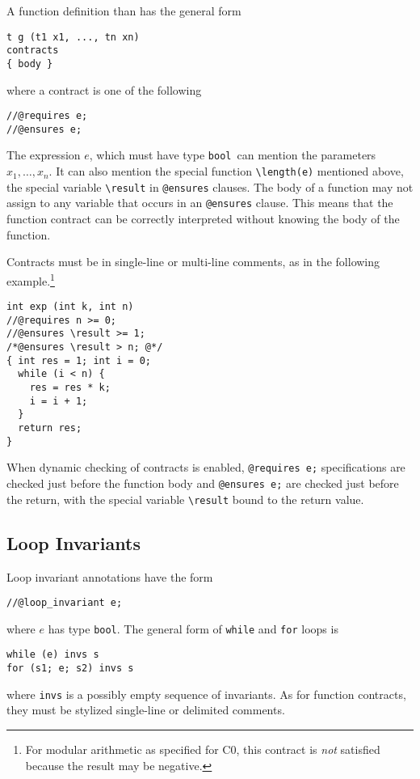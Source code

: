 \documentclass[11pt]{article}
\newcommand{\tbool}{\texttt{bool}}
\begin{document}
A function definition than has the general form
\begin{lstlisting}
t g (t1 x1, ..., tn xn)
contracts
{ body }
\end{lstlisting}
where a contract is one of the following
\begin{lstlisting}
//@requires e;
//@ensures e;
\end{lstlisting}
The expression $e$, which must have type \tbool\ can mention the
parameters $x_1, \ldots, x_n$.  It can also mention the special
function \lstinline'\length(e)' mentioned above, the special variable
\lstinline'\result' in \lstinline'@ensures' clauses.  The body of a function may
not assign to any variable that occurs in an \lstinline'@ensures' clause.
This means that the function contract can be correctly interpreted
without knowing the body of the function.

Contracts must be in single-line or multi-line comments, as in the
following example.\footnote{For modular arithmetic as specified
for C0, this contract is \emph{not} satisfied because the result may be
negative.}
\begin{lstlisting}
int exp (int k, int n)
//@requires n >= 0;
//@ensures \result >= 1;
/*@ensures \result > n; @*/
{ int res = 1; int i = 0;
  while (i < n) {
    res = res * k;
    i = i + 1;
  }
  return res;
}
\end{lstlisting}

When dynamic checking of contracts is enabled,
\lstinline'@requires e;' specifications are checked just
before the function body and \lstinline'@ensures e;'
are checked just before the return, with the special
variable \lstinline'\result' bound to the return value.

\subsection{Loop Invariants}

Loop invariant annotations have the form
\begin{lstlisting}
//@loop_invariant e;
\end{lstlisting}
where $e$ has type \tbool.  The general form of \lstinline'while'
and \lstinline'for' loops is
\begin{lstlisting}
while (e) invs s
for (s1; e; s2) invs s
\end{lstlisting}
where \lstinline'invs' is a possibly empty sequence of invariants.
As for function contracts, they must be stylized single-line
or delimited comments.
\end{document}
